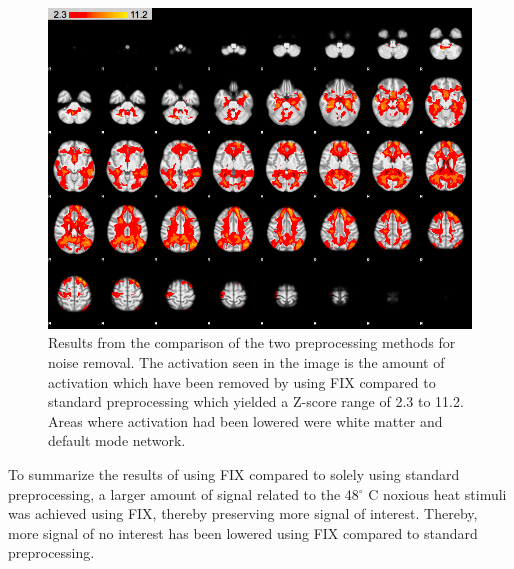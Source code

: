 \begin{figure}[H]                 
	\includegraphics[width=.65\textwidth]{figures/Results/diff_neg}  
	\caption{Results from the comparison of the two preprocessing methods for noise removal. The activation seen in the image is the amount of activation which have been removed by using FIX compared to standard preprocessing which yielded a Z-score range of 2.3 to 11.2. Areas where activation had been lowered were white matter and default mode network.}
	\label{fig:res:diff_neg} 
\end{figure}

To summarize the results of using FIX compared to solely using standard preprocessing, a larger amount of signal related to the 48$^\circ$ C noxious heat stimuli was achieved using FIX, thereby preserving more signal of interest. Thereby, more signal of no interest has been lowered using FIX compared to standard preprocessing. 
